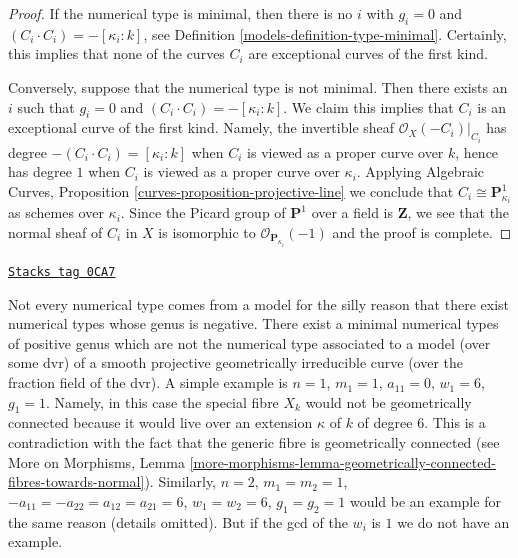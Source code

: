 \begin{proof}

If the numerical type is minimal, then there is no $i$ with
$g_i = 0$ and $(C_i \cdot C_i) = -[\kappa_i: k]$, see
Definition \ref{models-definition-type-minimal}.
Certainly, this implies that none of the curves $C_i$
are exceptional curves of the first kind.

\medskip\noindent
Conversely, suppose that the numerical type is not minimal.
Then there exists an $i$ such that $g_i = 0$ and
$(C_i \cdot C_i) = -[\kappa_i: k]$.
We claim this implies that $C_i$ is an exceptional curve
of the first kind. Namely, the invertible sheaf
$\mathcal{O}_X(-C_i)|_{C_i}$ has degree $-(C_i \cdot C_i) = [\kappa_i : k]$
when $C_i$ is viewed as a proper curve over $k$, hence
has degree $1$ when $C_i$ is viewed as a proper curve over $\kappa_i$.
Applying
Algebraic Curves, Proposition \ref{curves-proposition-projective-line}
we conclude that $C_i \cong \mathbf{P}^1_{\kappa_i}$ as schemes
over $\kappa_i$. Since the Picard group of $\mathbf{P}^1$
over a field is $\mathbf{Z}$, we see that the normal sheaf
of $C_i$ in $X$ is isomorphic to $\mathcal{O}_{\mathbf{P}_{\kappa_i}}(-1)$
and the proof is complete.
\end{proof}

\begin{remark}
\label{models-remark-numerical-type-not-from-model}
\href{https://stacks.math.columbia.edu/tag/0CA7}{\texttt{Stacks tag 0CA7}}

Not every numerical type comes from a model for the silly reason
that there exist numerical types whose genus is negative.
There exist a minimal numerical types of positive genus which
are not the numerical type associated to a model (over some dvr)
of a smooth projective geometrically irreducible curve (over the
fraction field of the dvr). A simple example is
$n = 1$, $m_1 = 1$, $a_{11} = 0$, $w_1 = 6$, $g_1 = 1$.
Namely, in this case the special fibre $X_k$ would not be
geometrically connected because it would live over an extension
$\kappa$ of $k$ of degree $6$. This is a contradiction with the
fact that the generic fibre is geometrically connected (see
More on Morphisms, Lemma
\ref{more-morphisms-lemma-geometrically-connected-fibres-towards-normal}).
Similarly, $n = 2$, $m_1 = m_2 = 1$, $-a_{11} = -a_{22} = a_{12} = a_{21} = 6$,
$w_1 = w_2 = 6$, $g_1 = g_2 = 1$ would be an example
for the same reason (details omitted). But if the gcd of
the $w_i$ is $1$ we do not have an example.
\end{remark}


